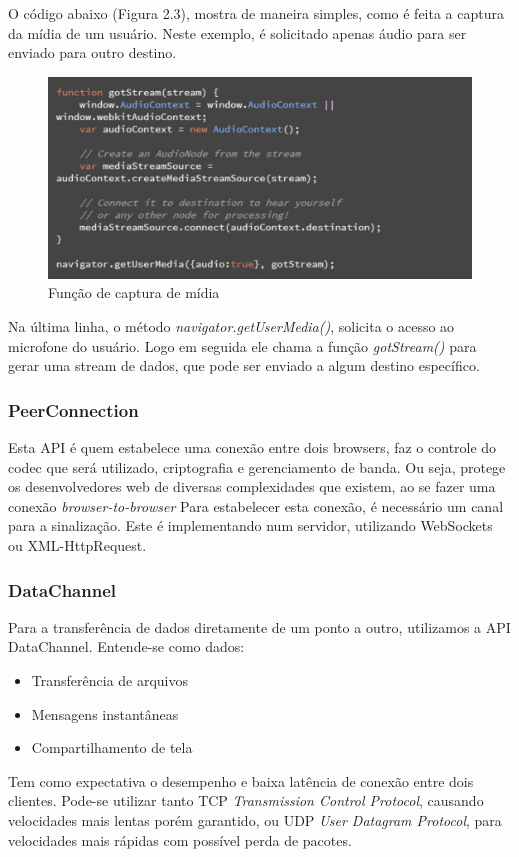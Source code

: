 \documentclass[ruledheader]{abnt} %
\begin{document}
O código abaixo (Figura 2.3), mostra de maneira simples, como é feita a captura da mídia de um usuário. Neste exemplo, é solicitado apenas áudio para ser enviado para outro destino. 

\begin{figure}[!htdb]
 \centering
  \includegraphics[width = 1\linewidth]{images/mediaStreamCode}
  \caption{Função de captura de mídia} %
  \label{f_mediaStreamCode}
\end{figure}

Na última linha, o método \textit {navigator.getUserMedia()}, solicita o acesso ao microfone do usuário. Logo em seguida ele chama a função \textit {gotStream()} para gerar uma stream de dados, que pode ser enviado a algum destino específico.

\subsubsection{PeerConnection}
\label{sss_peerConnection}
Esta API é quem estabelece uma conexão entre dois browsers, faz o controle do codec que será utilizado, criptografia e gerenciamento de banda. Ou seja, protege os desenvolvedores web de diversas complexidades que existem, ao se fazer uma conexão \textit{browser-to-browser} Para estabelecer esta conexão, é necessário um canal para a sinalização. Este é implementando num servidor, utilizando WebSockets ou XML-HttpRequest.

\subsubsection{DataChannel}
\label{sss_dataChannel}
Para a transferência de dados diretamente de um ponto a outro, utilizamos a API DataChannel. Entende-se como dados: 
\begin{itemize}
  \item Transferência de arquivos
  \item Mensagens instantâneas
  \item Compartilhamento de tela
\end{itemize}
Tem como expectativa o desempenho e baixa latência de conexão entre dois clientes. Pode-se utilizar tanto TCP \textit{Transmission Control Protocol}, causando velocidades mais lentas porém garantido, ou UDP \textit {User Datagram Protocol}, para velocidades mais rápidas com possível perda de pacotes.
\end{document}
